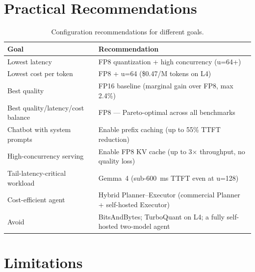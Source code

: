 \documentclass[a4paper,12pt]{report}
\begin{document}
\section{Practical Recommendations}

\begin{table}[h!]
\caption{Configuration recommendations for different goals.}
\centering
\begin{tabular}{|p{4cm}|p{9cm}|}
\hline
\textbf{Goal} & \textbf{Recommendation} \\
\hline
Lowest latency & FP8 quantization + high concurrency (u=64+) \\
\hline
Lowest cost per token & FP8 + u=64 (\$0.47/M tokens on L4) \\
\hline
Best quality & FP16 baseline (marginal gain over FP8, max 2.4\%) \\
\hline
Best quality/latency/cost balance & FP8 --- Pareto-optimal across all benchmarks \\
\hline
Chatbot with system prompts & Enable prefix caching (up to 55\% TTFT reduction) \\
\hline
High-concurrency serving & Enable FP8 KV cache (up to 3$\times$ throughput, no quality loss) \\
\hline
Tail-latency-critical workload & Gemma~4 (sub-600~ms TTFT even at u=128) \\
\hline
Cost-efficient agent & Hybrid Planner--Executor (commercial Planner + self-hosted Executor) \\
\hline
Avoid & BitsAndBytes; TurboQuant on L4; a fully self-hosted two-model agent \\
\hline
\end{tabular}
\label{table:recommendations}
\end{table}

\section{Limitations}
\end{document}
